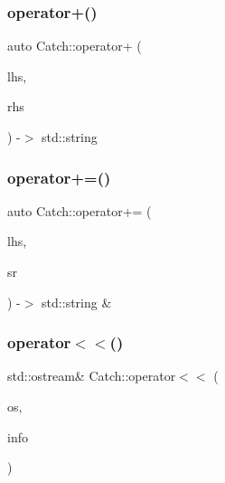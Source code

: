 \mbox{\label{namespace_catch_a764a678121fa11c590a53618baa47680}} 
\subsubsection{\texorpdfstring{operator+()}{operator+()}\hspace{0.1cm}{\footnotesize\ttfamily [4/4]}}
{\footnotesize\ttfamily auto Catch\+::operator+ (\begin{DoxyParamCaption}\item[{char const $\ast$}]{lhs,  }\item[{\mbox{\hyperlink{class_catch_1_1_string_ref}{String\+Ref}} const \&}]{rhs }\end{DoxyParamCaption}) -\/$>$  std\+::string}

\mbox{\label{namespace_catch_a61711bc909f8dc76d8b3deccc1440f46}} 
\subsubsection{\texorpdfstring{operator+=()}{operator+=()}}
{\footnotesize\ttfamily auto Catch\+::operator+= (\begin{DoxyParamCaption}\item[{std\+::string \&}]{lhs,  }\item[{\mbox{\hyperlink{class_catch_1_1_string_ref}{String\+Ref}} const \&}]{sr }\end{DoxyParamCaption}) -\/$>$  std\+::string \&}

\mbox{\label{namespace_catch_a6ec18b5054d7fdfdde861c580b082995}} 
\subsubsection{\texorpdfstring{operator$<$$<$()}{operator<<()}\hspace{0.1cm}{\footnotesize\ttfamily [1/2]}}
{\footnotesize\ttfamily std\+::ostream\& Catch\+::operator$<$$<$ (\begin{DoxyParamCaption}\item[{std\+::ostream \&}]{os,  }\item[{\mbox{\hyperlink{struct_catch_1_1_source_line_info}{Source\+Line\+Info}} const \&}]{info }\end{DoxyParamCaption})}

